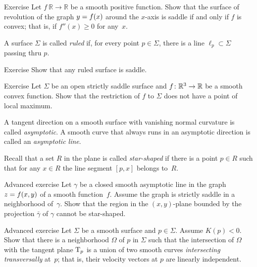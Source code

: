 \begin{thm}{Exercise}\label{ex:convex-revolution}
Let $f\:\mathbb{R}\to\mathbb{R}$ be a smooth positive function.
Show that the surface of revolution of the graph $y\z=f(x)$ around the $x$-axis
 is saddle if and only if $f$ is convex; that is, if $f''(x)\ge0$ for any~$x$.
\end{thm}

A surface $\Sigma$ is called \emph{ruled} if, for every point $p\in \Sigma$, there is a line $\ell_p\subset \Sigma$ passing thru $p$.

\begin{thm}{Exercise}\label{ex:ruled=>saddle}
Show that any ruled surface is saddle.
\end{thm}

\begin{thm}{Exercise}\label{ex:saddle-convex}
Let $\Sigma$ be an open strictly saddle surface and $f\:\mathbb{R}^3\z\to\mathbb{R}$ be a smooth convex function.
Show that the restriction of $f$ to $\Sigma$ does not have a point of local maximum.
\end{thm}

A tangent direction on a smooth surface with vanishing normal curvature is called \emph{asymptotic}.
A smooth curve that always runs in an asymptotic direction is called an
{}\emph{asymptotic line}.\label{page:asymptotic line}

Recall that a set $R$ in the plane is called \emph{star-shaped} if there is a point $p\in R$ such that for any $x\in R$ the line segment $[p,x]$ belongs to~$R$.

\begin{thm}{Advanced exercise}\label{ex:panov}
Let $\gamma$ be a closed smooth asymptotic line
in the graph $z\z=f(x,y)$ of a smooth function~$f$.
Assume the graph is strictly saddle in a neighborhood of~$\gamma$.
Show that the region in the $(x,y)$-plane bounded by the projection $\bar \gamma$ of $\gamma$ cannot be star-shaped.
\end{thm}

\begin{thm}{Advanced exercise}\label{ex:crosss}
Let $\Sigma$ be a smooth surface and $p\in \Sigma$.
Assume $K(p)<0$.
Show that there is a neighborhood $\Omega$ of $p$ in $\Sigma$
such that the intersection of $\Omega$ with the tangent plane $\mathrm{T}_p$ is a union of two smooth curves  \emph{intersecting transversally} at~$p$;
that is, their velocity vectors at $p$ are linearly independent.
\end{thm}


